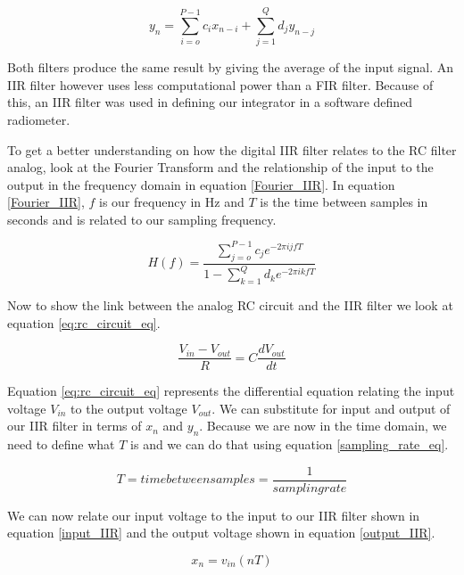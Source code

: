 \begin{equation}\label{IIR_eq}
y_n=\displaystyle\sum\limits_{i=o}^{P-1} c_ix_{n-i}+\displaystyle\sum\limits_{j=1}^{Q} d_jy_{n-j}
\end{equation}

Both filters produce the same result by giving the average of the input signal.  An IIR filter however uses less computational power than a FIR filter.  Because of this, an IIR filter was used in defining our integrator in a software defined radiometer.

To get a better understanding on how the digital IIR filter relates to the RC filter analog, look at the Fourier Transform and the relationship of the input to the output in the frequency domain in equation \ref{Fourier_IIR}.  In equation \ref{Fourier_IIR}, $f$ is our frequency in Hz and $T$ is the time between samples in seconds and is related to our sampling frequency.

\begin{equation}\label{Fourier_IIR}
H(f)=\frac{\displaystyle\sum\limits_{j=o}^{P-1} c_je^{-2\pi ijfT}}{1-\displaystyle\sum\limits_{k=1}^{Q} d_ke^{-2\pi ikfT}}
\end{equation}

Now to show the link between the analog RC circuit and the IIR filter we look at equation \ref{eq:rc_circuit_eq}.  

\begin{equation}\label{eq:rc_circuit_eq}
\frac{V_{in}-V_{out}}{R}=C\frac{dV_{out}}{dt}
\end{equation}

Equation \ref{eq:rc_circuit_eq} represents the differential equation relating the input voltage $V_{in}$ to the output voltage $V_{out}$.  We can substitute for input and output of our IIR filter in terms of $x_n$ and $y_n$.  Because we are now in the time domain, we need to define what $T$ is and we can do that using equation \ref{sampling_rate_eq}.

\begin{equation}\label{sampling_rate_eq}
T=time between samples=\frac{1}{sampling rate}
\end{equation}

We can now relate our input voltage to the input to our IIR filter shown in equation \ref{input_IIR} and the output voltage shown in equation \ref{output_IIR}.

\begin{equation}\label{input_IIR}
x_n=v_{in}(nT)
\end{equation}

